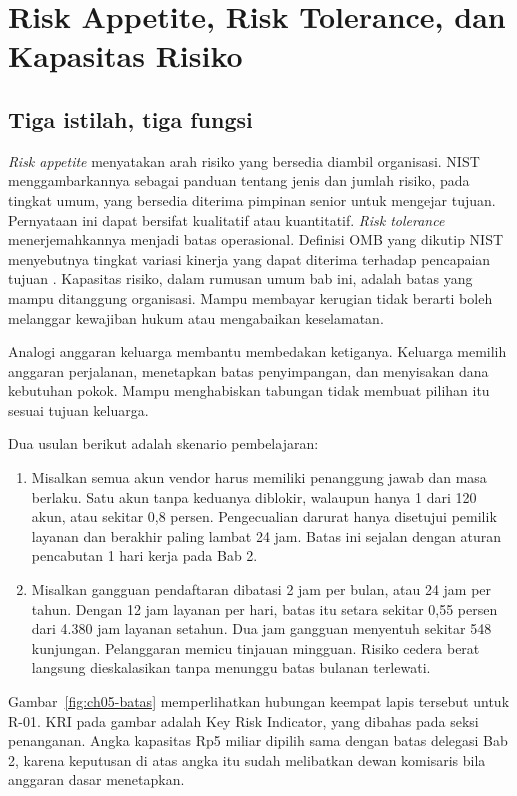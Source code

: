 \section{Risk Appetite, Risk Tolerance, dan Kapasitas Risiko}

\subsection*{Tiga istilah, tiga fungsi}

\textit{Risk appetite} menyatakan arah risiko yang bersedia diambil organisasi. NIST menggambarkannya
sebagai panduan tentang jenis dan jumlah risiko, pada tingkat umum, yang bersedia diterima pimpinan
senior untuk mengejar tujuan. Pernyataan ini dapat bersifat kualitatif atau kuantitatif. \textit{Risk
tolerance} menerjemahkannya menjadi batas operasional. Definisi OMB yang dikutip NIST menyebutnya
tingkat variasi kinerja yang dapat diterima terhadap pencapaian tujuan
\cite{c05-nist-ir8286ar1}. Kapasitas risiko, dalam rumusan umum bab ini, adalah batas yang mampu
ditanggung organisasi. Mampu membayar kerugian tidak berarti boleh melanggar kewajiban hukum atau
mengabaikan keselamatan.

Analogi anggaran keluarga membantu membedakan ketiganya. Keluarga memilih anggaran perjalanan,
menetapkan batas penyimpangan, dan menyisakan dana kebutuhan pokok. Mampu menghabiskan tabungan tidak
membuat pilihan itu sesuai tujuan keluarga.

Dua usulan berikut adalah skenario pembelajaran:
\begin{enumerate}
  \item Misalkan semua akun vendor harus memiliki penanggung jawab dan masa berlaku. Satu akun tanpa
  keduanya diblokir, walaupun hanya 1 dari 120 akun, atau sekitar 0,8 persen. Pengecualian darurat
  hanya disetujui pemilik layanan dan berakhir paling lambat 24 jam. Batas ini sejalan dengan aturan
  pencabutan 1 hari kerja pada Bab 2.
  \item Misalkan gangguan pendaftaran dibatasi 2 jam per bulan, atau 24 jam per tahun. Dengan 12 jam
  layanan per hari, batas itu setara sekitar 0,55 persen dari 4.380 jam layanan setahun. Dua jam
  gangguan menyentuh sekitar 548 kunjungan. Pelanggaran memicu tinjauan mingguan. Risiko cedera berat
  langsung dieskalasikan tanpa menunggu batas bulanan terlewati.
\end{enumerate}

Gambar~\ref{fig:ch05-batas} memperlihatkan hubungan keempat lapis tersebut untuk R-01. KRI pada gambar
adalah Key Risk Indicator, yang dibahas pada seksi penanganan. Angka kapasitas Rp5 miliar dipilih sama
dengan batas delegasi Bab 2, karena keputusan di atas angka itu sudah melibatkan dewan komisaris bila
anggaran dasar menetapkan.

